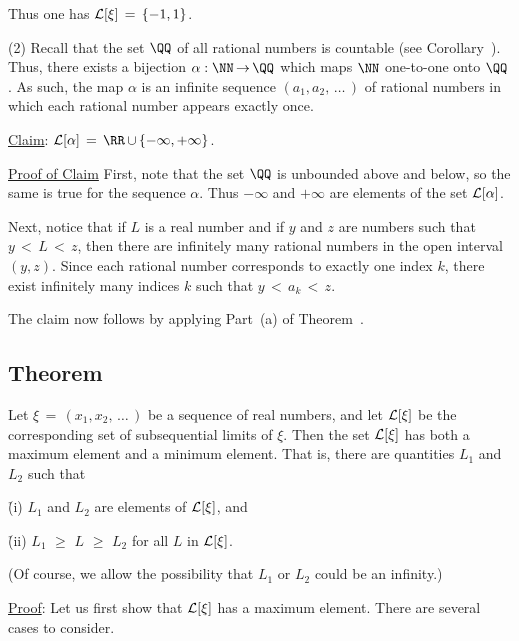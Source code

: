         Thus one has ${\cal L}[{\xi}] \,=\, \{-1,1\}$.

\V

        (2) Recall that the set ${\QQ}$ of all rational numbers is countable (see Corollary~).
    Thus, there exists a bijection ${\alpha}:{\NN} \,{\rightarrow}\, {\QQ}$ which maps ${\NN}$ one-to-one onto ${\QQ}$.
    As such, the map ${\alpha}$ is an infinite sequence $(a_{1},a_{2},\,{\ldots}\,)$ of rational numbers in which each rational number appears exactly once.

        \underline{Claim}: ${\cal L}[{\alpha}] \,=\, {\RR}\,{\cup}\,\{-{\infty},+{\infty}\}$.

        \underline{Proof of Claim} First, note that the set ${\QQ}$ is unbounded above and below, so the same is true for the sequence ${\alpha}$.
    Thus $-{\infty}$ and $+{\infty}$ are elements of the set ${\cal L}[{\alpha}]$.

        Next, notice that if $L$ is a real number and if $y$ and $z$ are numbers such that $y\,<\,L\,<\,z$,
    then there are infinitely many rational numbers in the open interval $(y,z)$.
    Since each rational number corresponds to exactly one index $k$, there exist infinitely many indices $k$ such that $y\,<\,a_{k}\,<\,z$.

        The claim now follows by applying Part~(a) of Theorem~.

\V
\V

            \subsection{\small{\bf Theorem}}
            \label{ThmC50.140}

        Let ${\xi} \,=\, (x_{1},x_{2},\,{\ldots}\,)$ be a sequence of real numbers, and let ${\cal L}[{\xi}]$ be the corresponding set of subsequential limits of ${\xi}$.
    Then the set ${\cal L}[{\xi}]$ has both a maximum element and a minimum element.
    That is, there are quantities $L_{1}$ and $L_{2}$ such that

       \h (i) $L_{1}$ and $L_{2}$ are elements of ${\cal L}[{\xi}]$, and

       \h (ii) $L_{1}\,\,{\geq}\,\,L\,\,{\geq}\,\,L_{2}$ for all $L$ in ${\cal L}[{\xi}]$.

\noindent (Of course, we allow the possibility that $L_{1}$ or $L_{2}$ could be an infinity.)


\V

        \underline{Proof}: Let us first show that ${\cal L}[{\xi}]$ has a maximum element.
    There are several cases to consider.

